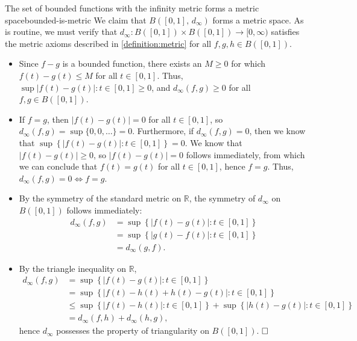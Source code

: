 \documentclass{article}
\renewcommand*\qedsymbol{\hfill\ensuremath{\Box}}
\numberwithin{equation}{section}
\numberwithin{enumi}{section}
\begin{document}
\begin{theorem}{The set of bounded functions with the infinity metric forms a
        metric space}{bounded-is-metric}
    We claim that $ B([0, 1],\, d_\infty) $ forms a metric space. As is routine,
    we must verify that $ d_\infty : B([0, 1]) \times B([0, 1]) \to [0, \infty)
    $ satisfies the metric axioms described in \cref{definition:metric} for all
    $ f, g, h \in B([0, 1]) $.
    \begin{itemize}
        \item Since $ f-g $ is a bounded function, there exists an $ M \geq 0 $
            for which $ f(t) - g(t) \leq M $ for all $ t \in [0, 1] $. Thus,
            $ \sup{\vert f(t) - g(t) \vert \colon t \in [0, 1]} \geq 0 $, and
            $ d_\infty(f, g) \geq 0 $ for all $ f, g \in B([0, 1]) $.
        \item If $ f = g $, then $ \vert f(t) - g(t) \vert = 0 $ for all $ t \in
            [0, 1] $, so $ d_\infty(f, g) = \sup\{0, 0, \ldots\} = 0 $.
            Furthermore, if $ d_\infty(f, g) = 0 $, then we know that $
            \sup\left\{ \vert f(t) - g(t) \vert \colon t \in [0, 1] \right\} = 0
            $. We know that $ \vert f(t) - g(t) \vert \geq 0 $, so $ \vert f(t)
            - g(t) \vert = 0 $ follows immediately, from which we can conclude
            that $ f(t) = g(t) $ for all $ t \in [0, 1] $, hence $ f = g $.
            Thus, $ d_\infty(f, g) = 0 \iff f = g $.
        \item By the symmetry of the standard metric on $ \mathbb{R} $, the
            symmetry of $ d_\infty $ on $ B([0, 1]) $ follows immediately:
            \begin{align}
                d_\infty(f, g) &= \sup\left\{ \vert f(t) - g(t) \vert \colon
                    t \in [0, 1] \right\} \\
                &= \sup\left\{ \vert g(t) - f(t) \vert \colon t \in [0, 1]
                    \right\} \\
                &= d_\infty(g, f).
            \end{align}
        \item By the triangle inequality on $ \mathbb{R} $,
            \begin{align}
                d_\infty(f, g) &= \sup\left\{ \vert f(t) - g(t) \vert \colon
                    t \in [0, 1] \right\} \\
                &= \sup\left\{ \vert f(t) - h(t) + h(t) - g(t) \vert \colon
                    t \in [0, 1] \right\} \\
                &\leq \sup\left\{ \vert f(t) - h(t) \vert \colon t \in [0, 1]
                    \right\} + \sup\left\{ \vert h(t) - g(t) \vert \colon t \in
                    [0, 1] \right\} \\
                &= d_\infty(f, h) + d_\infty(h, g),
            \end{align}
            hence $ d_\infty $ possesses the property of triangularity on $
            B([0, 1]) $. $ \qedsymbol $
    \end{itemize}
\end{theorem}
\end{document}
